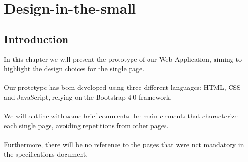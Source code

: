 \documentclass[12pt,a4paper]{article}
\begin{document}
\newpage
\section{Design-in-the-small}
\subsection{Introduction}
In this chapter we will present the prototype of our Web Application, aiming to highlight the design choices for the single page.\\\\
Our prototype has been developed using three different languages: HTML, CSS and JavaScript, relying on the Bootstrap 4.0 framework.\\\\
We will outline with some brief comments the main elements that characterize each single page, avoiding repetitions from other pages.\\\\
Furthermore, there will be no reference to the pages that were not mandatory in the specifications document.
\newpage
\end{document}
